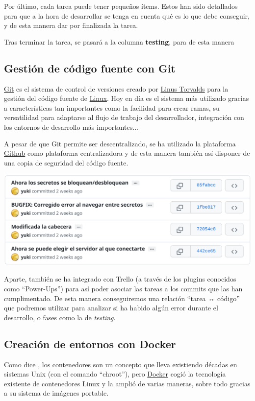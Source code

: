 \documentclass{\ClassPath/viu-tfm-template}
\begin{document}
Por último, cada tarea puede tener pequeños ítems. Estos han sido detallados para que a la hora de desarrollar se tenga en cuenta qué es lo que debe conseguir, y de esta manera dar por finalizada la tarea.

Tras terminar la tarea, se pasará a la columna \textbf{testing}, para de esta manera

\subsection{Gestión de código fuente con Git}

\href{https://es.wikipedia.org/wiki/Git}{Git} es el sistema de control de versiones creado por \href{https://es.wikipedia.org/wiki/Linus_Torvalds}{Linus Torvalds} para la gestión del código fuente de \href{https://es.wikipedia.org/wiki/N%C3%BAcleo_Linux}{Linux}. Hoy en día es el sistema más utilizado gracias a características tan importantes como la facilidad para crear ramas, su versatilidad para adaptarse al flujo de trabajo del desarrollador, integración con los entornos de desarrollo más importantes...

A pesar de que Git permite ser descentralizado, se ha utilizado la plataforma \href{https://github.com/}{Github} como plataforma centralizadora y de esta manera también así disponer de una copia de seguridad del código fuente.

\begin{center}
    \includegraphics[width=0.8\linewidth]{img/commits.png}
\end{center}

Aparte, también se ha integrado con Trello (a través de los plugins conocidos como “Power-Ups”) para así poder asociar las tareas a los commits que las han cumplimentado. De esta manera conseguiremos una relación “tarea ↔ código” que podremos utilizar para analizar si ha habido algún error durante el desarrollo, o fases como la de \textit{testing}.


\subsection{Creación de entornos con Docker}
Como dice \textcite{mouat}, los contenedores son un concepto que lleva existiendo décadas en sistemas Unix (con el comando “chroot”), pero \href{https://es.wikipedia.org/wiki/Docker_(software)}{Docker} cogió la tecnología existente de contenedores Linux y la amplió de varias maneras, sobre todo gracias a su sistema de imágenes portable.
\end{document}
